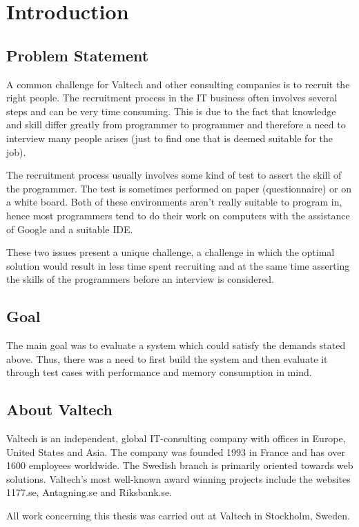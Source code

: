 \chapter{Introduction}

\section{Problem Statement}

A common challenge for Valtech and other consulting companies is to recruit the right people.  The recruitment process in the IT business often involves several steps and can be very time consuming. This is due to the fact that knowledge and skill differ greatly from programmer to programmer and therefore a need to interview many people arises (just to find one that is deemed suitable for the job). 

The recruitment process usually involves some kind of test to assert the skill of the programmer.  The test is sometimes performed on paper (questionnaire) or on a white board. Both of these environments aren’t really suitable to program in, hence most programmers tend to do their work on computers with the assistance of Google and a suitable IDE. 

These two issues present a unique challenge, a challenge in which the optimal solution would result in less time spent recruiting and at the same time asserting the skills of the programmers before an interview is considered.

\section{Goal}
The main goal was to evaluate a system which could satisfy the demands stated above. Thus, there was a need to first build the system and then evaluate it through test cases with performance and memory consumption in mind. 

\section{About Valtech}
Valtech is an independent, global IT-consulting company with offices in Europe, United States and Asia. The company was founded 1993 in France and has over 1600 employees worldwide. The Swedish branch is primarily oriented towards web solutions. 
Valtech's most well-known award winning projects include the websites 1177.se, Antagning.se and Riksbank.se. 

All work concerning this thesis was carried out at Valtech in Stockholm, Sweden.






